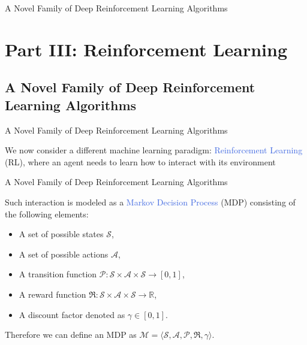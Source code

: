 \documentclass{beamer}
\begin{document}


\begin{frame}{A Novel Family of Deep Reinforcement Learning Algorithms}
	\section{Part III: Reinforcement Learning}
	\subsection{A Novel Family of Deep Reinforcement Learning Algorithms}
\end{frame}

\begin{frame}{A Novel Family of Deep Reinforcement Learning Algorithms}

	\bigskip
	We now consider a different machine learning paradigm: \textcolor{RoyalBlue}{Reinforcement Learning} (RL), where an agent needs to learn how to interact with its environment

	\begin{figure}[htb!]
		\centering
		
 		\label{fig:rl_loop}
	\end{figure}

\end{frame}

\begin{frame}{A Novel Family of Deep Reinforcement Learning Algorithms}

	Such interaction is modeled as a \textcolor{RoyalBlue}{Markov Decision Process} (MDP) consisting of the following elements:

\begin{itemize}
	\item A set of possible states $\mathcal{S}$,
	\item A set of possible actions $\mathcal{A}$,
	\item A transition function $\mathcal{P}:\mathcal{S}\times\mathcal{A}\times\mathcal{S}\rightarrow [0,1]$,
	\item A reward function $\Re:\mathcal{S}\times\mathcal{A}\times\mathcal{S}\rightarrow \mathbb{R}$,
	\item A discount factor denoted as $\gamma \in [0,1]$.
\end{itemize}

\bigskip

Therefore we can define an MDP as $\mathcal{M}=\langle\mathcal{S}, \mathcal{A}, \mathcal{P}, \Re, \gamma\rangle$.

\end{frame}
\end{document}
